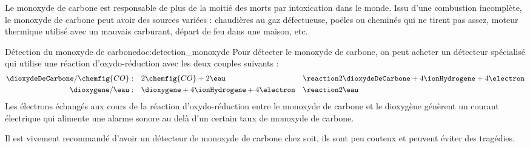 \label{exo:intoxication_CO}
\medskip

Le monoxyde de carbone est responsable de plus de la moitié des morts par intoxication dans le monde.
Issu d'une combustion incomplète, le monoxyde de carbone peut avoir des sources variées : chaudières au gaz défectueuse, poëles ou cheminés qui ne tirent pas assez, moteur thermique utilisé avec un mauvais carburant, départ de feu dans une maison, etc.

\begin{doc}{Détection du monoxyde de carbone}{doc:detection_monoxyde}
    Pour détecter le monoxyde de carbone, on peut acheter un détecteur spécialisé qui utilise une réaction d'oxydo-réduction avec les deux couples suivants :
    \begin{alignat*}{2}
      \dioxydeDeCarbone/\chemfig{CO} : \quad
      & 2\chemfig{CO} + 2\eau 
      && \reaction 2\dioxydeDeCarbone + 4\ionHydrogene + 4\electron \\
      \dioxygene/\eau : \quad
      & \dioxygene + 4\ionHydrogene + 4\electron 
      && \reaction 2\eau
    \end{alignat*}
  Les électrons échangés aux cours de la réaction d'oxydo-réduction entre le monoxyde de carbone et le dioxygène génèrent un courant électrique qui alimente une alarme sonore au delà d'un certain taux de monoxyde de carbone.

  Il est vivement recommandé d'avoir un détecteur de monoxyde de carbone chez soit, ils sont peu couteux et peuvent éviter des tragédies.
\end{doc}





